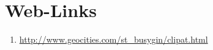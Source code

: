 \section*{Web-Links}
\begin{enumerate}
   \item \href{http://www.geocities.com/st\_busygin/clipat.html}
              {http://www.geocities.com/st\_busygin/clipat.html }
\end{enumerate}

